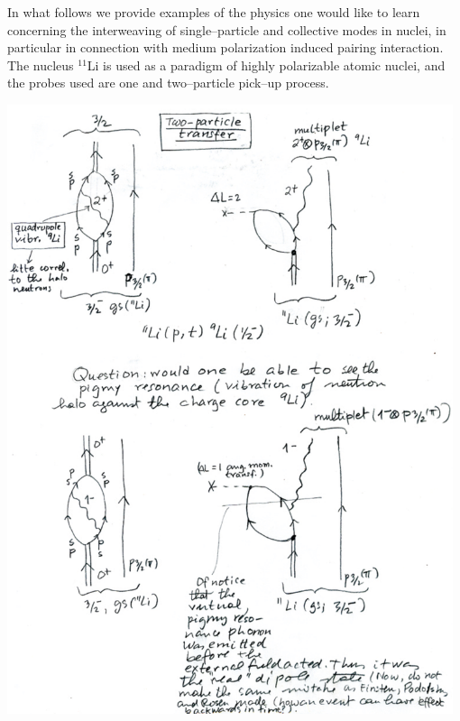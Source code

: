 \documentclass[a4paper,onecolumn,superscriptaddress,12pt,nofootinbib,twoside,raggedfooter,notitlepage]{revtex4-1}
\begin{document}
In what follows we provide examples of the physics one would like to learn concerning the interweaving of single--particle and collective modes in nuclei, in particular in connection with medium polarization induced pairing interaction. The nucleus ${}^{11}$Li is used as a paradigm of highly polarizable atomic nuclei, and the probes used are one and two--particle pick--up process.
\begin{center}
	\includegraphics[width=0.98\textwidth]{figs/fig_c1}
\end{center}
\end{document}
